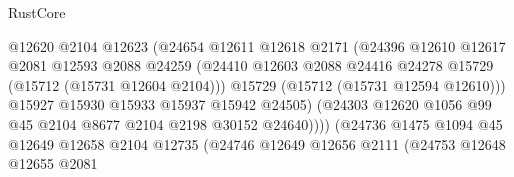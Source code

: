 \begin{lexlean}{RustCore}
\begin{coremodule}
                                      @12620
                                      @2104
                                      @12623
                                      (@24654
                                        @12611
                                        @12618
                                        @2171
                                        (@24396
                                          @12610
                                          @12617
                                          @2081
                                          @12593
                                          @2088
                                          @24259
                                          (@24410
                                            @12603
                                            @2088
                                            @24416
                                            @24278
                                            @15729
                                            (@15712 (@15731 @12604 @2104)))
                                          @15729
                                          (@15712 (@15731 @12594 @12610)))
                                        @15927
                                        @15930
                                        @15933
                                        @15937
                                        @15942
                                        @24505)
                                      (@24303
                                        @12620
                                        @1056
                                        @99
                                        @45
                                        @2104
                                        @8677
                                        @2104
                                        @2198
                                        @30152
                                        @24640))))
                                (@24736
                                  @1475
                                  @1094
                                  @45
                                  @12649
                                  @12658
                                  @2104
                                  @12735
                                  (@24746
                                    @12649
                                    @12656
                                    @2111
                                    (@24753
                                      @12648
                                      @12655
                                      @2081

\end{coremodule}
\end{lexlean}
